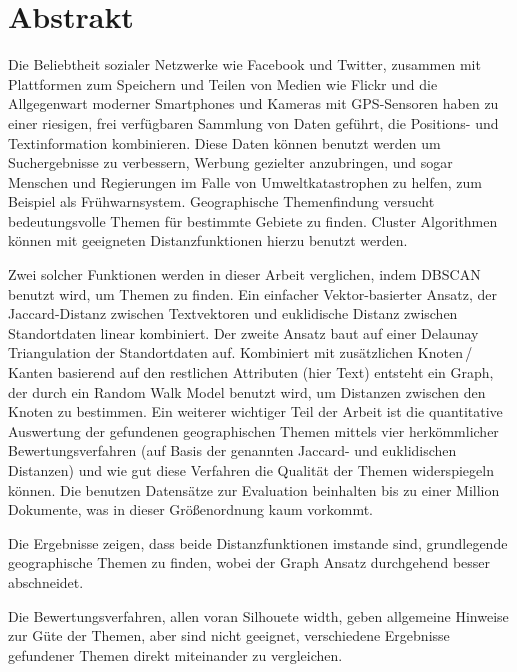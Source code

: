 \chapter*{Abstrakt}
Die Beliebtheit sozialer Netzwerke wie Facebook und Twitter, zusammen mit Plattformen zum Speichern und Teilen von Medien wie Flickr und die Allgegenwart moderner Smartphones und Kameras mit GPS-Sensoren haben zu einer riesigen, frei verfügbaren Sammlung von Daten geführt, die Positions- und Textinformation kombinieren. Diese Daten können benutzt werden um Suchergebnisse zu verbessern, Werbung gezielter anzubringen, und sogar Menschen und Regierungen im Falle von Umweltkatastrophen zu helfen, zum Beispiel als Frühwarnsystem. Geographische Themenfindung versucht bedeutungsvolle Themen für bestimmte Gebiete zu finden. Cluster Algorithmen können mit geeigneten Distanzfunktionen hierzu benutzt werden.

Zwei solcher Funktionen werden in dieser Arbeit verglichen, indem DBSCAN benutzt wird, um Themen zu finden. Ein einfacher Vektor-basierter Ansatz, der Jaccard-Distanz zwischen Textvektoren und euklidische Distanz zwischen Standortdaten linear kombiniert. Der zweite Ansatz baut auf einer Delaunay Triangulation der Standortdaten auf. Kombiniert mit zusätzlichen Knoten\,/\,Kanten basierend auf den restlichen Attributen (hier Text) entsteht ein Graph, der durch ein Random Walk Model benutzt wird, um Distanzen zwischen den Knoten zu bestimmen. Ein weiterer wichtiger Teil der Arbeit ist die quantitative Auswertung der gefundenen geographischen Themen mittels vier herkömmlicher Bewertungsverfahren (auf Basis der genannten Jaccard- und euklidischen Distanzen) und wie gut diese Verfahren die Qualität der Themen widerspiegeln können. Die benutzen Datensätze zur Evaluation beinhalten bis zu einer Million Dokumente, was in dieser Größenordnung kaum vorkommt.

\enlargethispage*{3\baselineskip}
\vspace{0.5em}
\noindent
Die Ergebnisse zeigen, dass beide Distanzfunktionen imstande sind, grundlegende geographische Themen zu finden, wobei der Graph Ansatz durchgehend besser abschneidet.

Die Bewertungsverfahren, allen voran Silhouete width, geben allgemeine Hinweise zur Güte der Themen, aber sind nicht geeignet, verschiedene Ergebnisse gefundener Themen direkt miteinander zu vergleichen.
